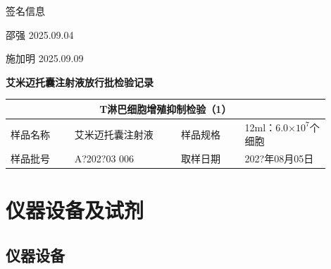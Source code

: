 \documentclass[UTF8,10pt,a4paper,fontset=fandol]{ctexart}
\newcommand{\fieldvalue}[1]{#1}
\newcommand{\handwritten}[1]{#1}
\begin{document}
\vspace{1em}

签名信息

\vfill

\noindent
\handwritten{邵强}
\hfill
\handwritten{2025.09.04}

\vspace{1em}

\noindent
\handwritten{施加明}
\hfill
\handwritten{2025.09.09}

\newpage

\begin{center}
\textbf{艾米迈托囊注射液放行批检验记录}
\end{center}

\begin{tabular}{|p{0.18\linewidth}|p{0.30\linewidth}|p{0.18\linewidth}|p{0.24\linewidth}|}
\hline
\multicolumn{4}{|c|}{T淋巴细胞增殖抑制检验（1）}\\
\hline
样品名称 & 艾米迈托囊注射液 & 样品规格 & 12ml：6.0$\times 10^{7}$个细胞\\
\hline
样品批号 &
\fieldvalue{\handwritten{A?202?03 006}} &
取样日期 &
\fieldvalue{\handwritten{202?年08月05日}}\\
\hline
\end{tabular}

\section{仪器设备及试剂}

\subsection{仪器设备}
\end{document}
